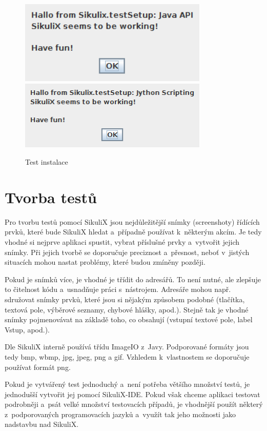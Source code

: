 	\begin{figure}[ht!]
		\centering
		\caption{Test instalace}
		\label{InstalOK}
		\includegraphics[width=9cm]{img/Instalace/InstalaceOK.png}\\[0.3cm]
		\includegraphics[width=9cm]{img/Instalace/InstalaceOK1.png}
	\end{figure}
	
	\section{Tvorba testů}
	Pro tvorbu testů pomocí SikuliX jsou nejdůležitější snímky (screenshoty) řídících prvků, které bude SikuliX hledat a~případně používat k~některým akcím. Je tedy vhodné si nejprve aplikaci spustit, vybrat příslušné prvky a~vytvořit jejich snímky. Při jejich tvorbě se doporučuje preciznost a~přesnost, neboť v~jistých situacích mohou nastat problémy, které budou zmíněny později.
	
	Pokud je snímků více, je vhodné je třídit do adresářů. To není nutné, ale zlepšuje to čitelnost kódu a~usnadňuje práci s~nástrojem. Adresáře mohou např. sdružovat snímky prvků, které jsou si nějakým způsobem podobné (tlačítka, textová pole, výběrové seznamy, chybové hlášky, apod.). Stejně tak je vhodné snímky pojmenovávat na základě toho, co obsahují (vstupní textové pole, label Vstup, apod.).
	
	Dle \citep{SikuliXImgs} SikuliX interně používá třídu ImageIO z~Javy. Podporované formáty jsou tedy bmp, wbmp, jpg, jpeg, png a gif. Vzhledem k~vlastnostem se doporučuje používat formát png.
	
	Pokud je vytvářený test jednoduchý a~není potřeba většího množství testů, je jednodušší vytvořit jej pomocí SikuliX-IDE. Pokud však chceme aplikaci testovat podrobněji a~psát velké množství testovacích případů, je vhodnější použít některý z~podporovaných programovacích jazyků a~využít tak jeho možnosti jako nadstavbu nad SikuliX.
	
